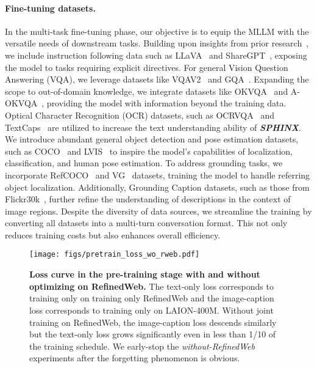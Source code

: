 \documentclass{article} \usepackage{iclr2024_conference,times}
\begin{document}
\paragraph{Fine-tuning datasets.}
In the multi-task fine-tuning phase, our objective is to equip the MLLM with the versatile needs of downstream tasks. Building upon insights from prior research~\citep{llava,Dai2023InstructBLIPTG,chen2023shikra,zhu2023minigpt,Liu2023ImprovedBW}, we include instruction following data such as LLaVA~\citep{llava} and ShareGPT~\citep{ShareGPT}, exposing the model to tasks requiring explicit directives. For general Vision Question Answering (VQA), we leverage datasets like VQAV2~\citep{Agrawal2015VQAVQ} and GQA~\citep{Hudson2019GQAAN}. Expanding the scope to out-of-domain knowledge, we integrate datasets like OKVQA~\citep{Marino2019OKVQAAV} and A-OKVQA~\citep{Schwenk2022AOKVQAAB}, providing the model with information beyond the training data. Optical Character Recognition (OCR) datasets, such as OCRVQA~\citep{Mishra2019OCRVQAVQ} and TextCaps~\citep{Sidorov2020TextCapsAD} are utilized to increase the text understanding ability of \textcolor{Goldenrod3}{\textbf{\textit{SPHINX}}}. We introduce abundant general object detection and pose estimation datasets, such as COCO~\citep{cocodataset} and LVIS~\citep{gupta2019lvis} to inspire the model's capabilities of localization, classification, and human pose estimation. To address grounding tasks, we incorporate RefCOCO~\citep{Kazemzadeh2014ReferItGameRT} and VG~\citep{krishna2017visual} datasets, training the model to handle referring object localization. Additionally, Grounding Caption datasets, such as those from Flickr30k~\citep{Plummer2015Flickr30kEC}, further refine the understanding of descriptions in the context of image regions. Despite the diversity of data sources, we streamline the training by converting all datasets into a multi-turn conversation format. This not only reduces training costs but also enhances overall efficiency. 


\begin{figure}
    \centering
    \texttt{[image: figs/pretrain\_loss\_wo\_rweb.pdf]}
    \caption{{\bf Loss curve in the pre-training stage with and without optimizing on RefinedWeb.} The text-only loss corresponds to training only on training only RefinedWeb and the image-caption loss corresponds to training only on LAION-400M. Without joint training on RefinedWeb, the image-caption loss descends similarly but the text-only loss grows significantly even in less than 1/10 of the training schedule. We early-stop the {\it without-RefinedWeb} experiments after the forgetting phenomenon is obvious.}
    \label{fig:pretrain_loss_wo_rweb}
\end{figure}
\end{document}
